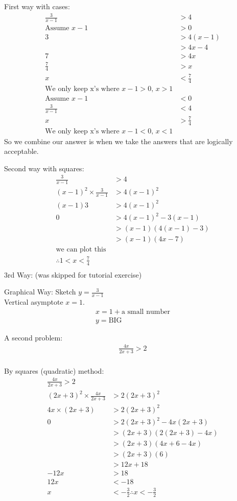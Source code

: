 First way with cases:
\begin{align}
  \frac{3}{x-1} & > 4 \\
  \text{Assume } x-1 & > 0 \\
  3 & > 4(x-1) \\
    & > 4x - 4 \\
  7 & > 4x \\
  \frac{7}{4} & > x \\
  x & < \frac{7}{4} \\
  \text{We only keep x's where $x-1 > 0$, $x > 1$} \nonumber \\
  \text{Assume } x-1 & < 0 \\
  \frac{3}{x-1} & < 4 \\
  x & > \frac{7}{4} \\
  \text{We only keep x's where $x-1 < 0$, $x < 1$} \nonumber
\end{align}
So we combine our answer is when we take the answers that are logically
acceptable.

Second way with squares:
\begin{align}
  \frac{3}{x-1} & > 4 \\
  (x-1)^2 \times \frac{3}{x-1} & > 4 (x-1)^2 \\
  (x-1)3 & > 4(x-1)^2 \\
  0 & > 4(x-1)^2 - 3(x-1) \\
    & > (x-1)(4(x-1) - 3) \\
    & > (x-1)(4x - 7) \\
\text{we can plot this} \\
 \therefore 1 < x < \frac{7}{4} \\
\end{align}
3rd Way: (was skipped for tutorial exercise)

Graphical Way:
Sketch $y = \frac{3}{x-1}$ \\
Vertical asymptote $x = 1$.
\begin{align}
  x = 1 + \text{a small number} \\
  y = \text{BIG}
\end{align}


A second problem:
\begin{align}
  \frac{4x}{2x+3} > 2 \\
\end{align}

By squares (quadratic) method:
\begin{align}
  \frac{4x}{2x+3} > 2 \\
  (2x+3)^2 \times \frac{4x}{2x+3} & > 2(2x+3)^2 \\
  4x \times (2x+3) & >  2(2x+3)^2 \\
  0 & > 2(2x+3)^2 - 4x(2x+3) \\
    & > (2x+3)(2(2x+3) -4x) \\
    & > (2x+3)(4x +6 -4x) \\
    & > (2x+3)(6) \\
    & > 12x + 18 \\
    -12x & > 18 \\
    12x  & < -18 \\
       x & < -\frac{3}{2}
    \therefore x < -\frac{3}{2}
\end{align}


